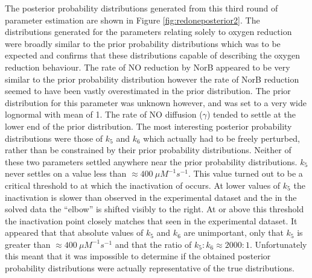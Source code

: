 The posterior probability distributions generated from this third round of parameter estimation are shown in Figure \ref{fig:redoneposterior2}. The distributions generated for the parameters relating solely to oxygen reduction were broadly similar to the prior probability distributions which was to be expected and confirms that these distributions capable of describing the oxygen reduction behaviour. The rate of NO reduction by NorB appeared to be very similar to the prior probability distribution however the rate of NorB reduction seemed to have been vastly overestimated in the prior distribution. The prior distribution for this parameter was unknown however, and was set to a very wide lognormal with mean of 1. The rate of NO diffusion ($\gamma$) tended to settle at the lower end of the prior distribution. The most interesting posterior probability distributions were those of $k_5$ and $k_6$ which actually had to be freely perturbed, rather than be constrained by their prior probability distributions. Neither of these two parameters settled anywhere near the prior probability distributions. $k_5$ never settles on a value less than $\approx 400~\mu M^{-1}s^{-1}$. This value turned out to be a critical threshold to at which the inactivation of \cbbthree{} occurs. At lower values of $k_5$ the inactivation is slower than observed in the experimental dataset and the in the solved data the ``elbow'' is shifted visibly to the right. At or above this threshold the inactivation point closely matches that seen in the experimental dataset. It appeared that that absolute values of $k_5$ and $k_6$ are unimportant, only that $k_5$ is greater than $\approx 400~\mu M^{-1}s^{-1}$ and that the ratio of $k_5:k_6 \approx 2000:1$. Unfortunately this meant that it was impossible to determine if the obtained posterior probability distributions were actually representative of the true distributions.

